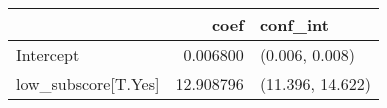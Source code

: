 \begin{tabular}{lrl}
\toprule
{} &       coef &          conf\_int \\
\midrule
Intercept           &   0.006800 &    (0.006, 0.008) \\
low\_subscore[T.Yes] &  12.908796 &  (11.396, 14.622) \\
\bottomrule
\end{tabular}
